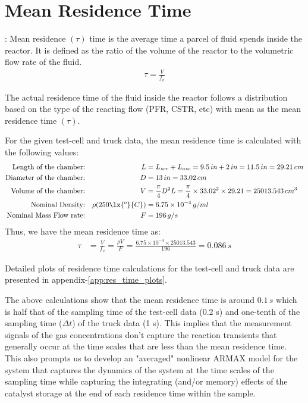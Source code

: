 \newpage
\section{Mean Residence Time}

: Mean residence $(\tau)$ time is the average time a parcel of fluid spends inside the reactor. It is
defined as the ratio of the volume of the reactor to the volumetric flow rate of the fluid.
\begin{align}
    \tau = \frac{V}{f_v}
\end{align}

The actual residence time of the fluid inside the reactor follows a distribution based on the type of the reacting flow
(PFR, CSTR, etc) with mean as the mean residence time $(\tau)$.

For the given test-cell and truck data, the mean residence time is calculated with the following values:
\begin{align*}
    \text{Length of the chamber:}&&
    L &= L_{scr} + L_{asc} = 9.5 \, in  + 2 \, in = 11.5 \, in = 29.21 \, cm\\
    \text{Diameter of the chamber:} &&
    D &= 13 \, in = 33.02 \, cm\\
    \text{Volume of the chamber:} &&
    V &= \frac{\pi}{4} D^2 L = \frac{\pi}{4} \times 33.02^2 \times 29.21 = 25013.543 \, cm^3\\
    \text{Nominal Density:} &&
    \rho(250 \lx{^o}{C}) &= 6.75 \times 10^{-4} \, g/ml\\
    \text{Nominal Mass Flow rate:} &&
    F &= 196 \, g/s
\end{align*}
Thus, we have the mean residence time as:
\begin{align}
    \tau &= \frac{V}{f_v} = \frac{\rho V}{F} = \frac{6.75 \times 10^{-4} \times 25013.543}{196} = 0.086 \, s
\end{align}

Detailed plots of residence time calculations for the test-cell and truck data are presented in
appendix-\ref{app:res_time_plots}.

The above calculations show that the mean residence time is around $0.1 \, s$ which is half that of the sampling time of
the test-cell data (0.2 s) and one-tenth of the sampling time ($\Delta t$) of the truck data (1 s). This implies that
the measurement signals of the gas concentrations don't capture the reaction transients that generally occur at the time
scales  that are less than the mean residence time. This also prompts us to develop an "averaged" nonlinear ARMAX model
for the system that captures the dynamics of the system at the time scales of the sampling time while capturing the
integrating (and/or memory) effects of the catalyst storage at the end of each residence time within the sample.

